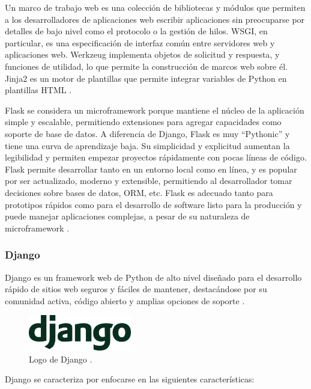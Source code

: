 Un marco de trabajo web es una colección de bibliotecas y módulos que permiten
a los desarrolladores de aplicaciones web escribir aplicaciones sin preocuparse
por detalles de bajo nivel como el protocolo o la gestión de hilos. WSGI, en
particular, es una especificación de interfaz común entre servidores web y
aplicaciones web. Werkzeug implementa objetos de solicitud y respuesta, y
funciones de utilidad, lo que permite la construcción de marcos web sobre él.
Jinja2 es un motor de plantillas que permite integrar variables de Python en
plantillas HTML \cite{Python_Basics_Flask}.

Flask se considera un microframework porque mantiene el núcleo de la aplicación
simple y escalable, permitiendo extensiones para agregar capacidades como
soporte de base de datos. A diferencia de Django, Flask es muy ``Pythonic'' y
tiene una curva de aprendizaje baja. Su simplicidad y explicitud aumentan la
legibilidad y permiten empezar proyectos rápidamente con pocas líneas de código.
Flask permite desarrollar tanto en un entorno
local como en línea, y es popular por ser actualizado, moderno y extensible,
permitiendo al desarrollador tomar decisiones sobre bases de datos, ORM, etc.
Flask es adecuado tanto para prototipos rápidos como para el desarrollo de
software listo para la producción y puede manejar aplicaciones complejas, a
pesar de su naturaleza de microframework \cite{Flask_Documentation}.

\subsubsection{Django}
Django es un framework web de Python de alto nivel diseñado para el desarrollo rápido de sitios web seguros y fáciles de mantener, destacándose por su comunidad activa, código abierto y amplias opciones de soporte \cite{MDN_Web_Docs_Django}.

\begin{figure}[!htbp]
  \centering
  \includegraphics[width=0.4\textwidth]{imagenes/02-marco-teorico/logo-django.png}
  \caption[Logo de Django]{Logo de Django \cite{MDN_Web_Docs_Django}.}
  \label{fig:django-logo}
\end{figure}

Django se caracteriza por enfocarse en las siguientes características:

